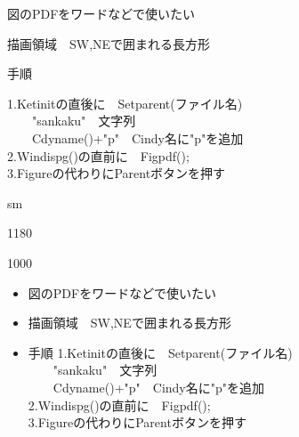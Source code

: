 \documentclass[landscape,10pt]{ujarticle}
\newcommand{\slidepage}[1][s]{%
\setcounter{ketpicctra}{18}%
\if#1m \setcounter{ketpicctra}{1}\fi
\hypersetup{linkcolor=black}%

\begin{layer}{118}{0}
\putnotee{122}{-\theketpicctra.05}{\small\thepage/\pageref{pageend}}
\end{layer}\hypersetup{linkcolor=blue}

}
\begin{document}
\begin{itemize}
\item
図のPDFをワードなどで使いたい\vspace{-2mm}
\item
描画領域　SW,NEで囲まれる長方形\\\vspace{-2mm}
{\color[cmyk]{\thin,\thin,\thin,\thin}%
\item
手順
}%
{\color[cmyk]{\thin,\thin,\thin,\thin}%
1.Ketinitの直後に　Setparent(ファイル名)\\
}%
{\color[cmyk]{\thin,\thin,\thin,\thin}%
　　"sankaku"　文字列\\
}%
{\color[cmyk]{\thin,\thin,\thin,\thin}%
　　Cdyname()+"p"　Cindy名に"p"を追加\\
}%
{\color[cmyk]{\thin,\thin,\thin,\thin}%
2.Windispg()の直前に　Figpdf();\\
}%
{\color[cmyk]{\thin,\thin,\thin,\thin}%
3.Figureの代わりにParentボタンを押す
}%
\end{itemize}

\sameslide

\vspace*{18mm}

\slidepage

\begin{layer}{100}{0}
\end{layer}

\begin{itemize}
\item
図のPDFをワードなどで使いたい\vspace{-2mm}
\item
描画領域　SW,NEで囲まれる長方形\\\vspace{-2mm}
\item
手順
1.Ketinitの直後に　Setparent(ファイル名)\\
　　"sankaku"　文字列\\
　　Cdyname()+"p"　Cindy名に"p"を追加\\
2.Windispg()の直前に　Figpdf();\\
3.Figureの代わりにParentボタンを押す
\end{itemize}
\end{document}

